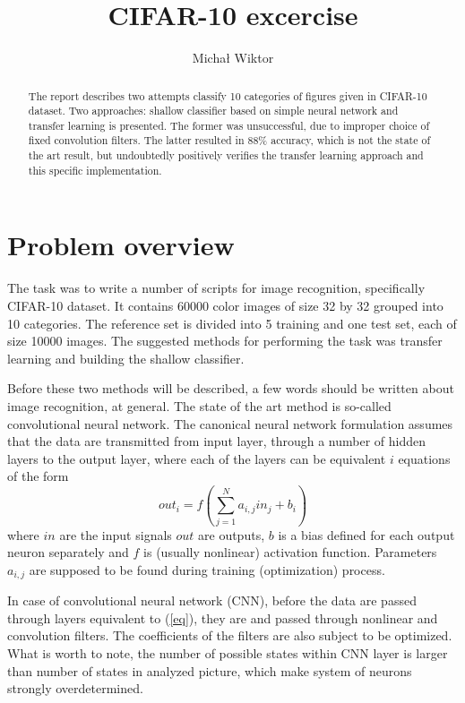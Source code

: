 \documentclass{article}
\author{Micha\l{ }Wiktor}
\title{CIFAR-10 excercise}
\date{}
\begin{document}
\maketitle
\begin{abstract}
  The report describes two attempts classify
  10 categories of figures given in CIFAR-10 dataset.
  Two approaches: shallow classifier based on simple neural network
  and transfer learning is presented.
  The former was unsuccessful, due to improper choice of fixed
  convolution filters. The latter resulted in 88\% accuracy,
  which is not the state of the art result, but undoubtedly positively
  verifies the transfer learning approach and this specific implementation.
\end{abstract}

\section{Problem overview}

The task was to write a number of scripts for image recognition, specifically CIFAR-10 dataset.
It contains 60000 color images of size 32 by 32 grouped into 10 categories.
The reference set is divided into 5 training and one test set, each of size 10000
images. The suggested methods for performing the task was transfer learning and
building the shallow classifier.

Before these two methods will be described, a few words should be written about
image recognition, at general. The state of the art method is so-called
convolutional neural network. The canonical neural network formulation assumes
that  the data are transmitted from input layer, through a number of hidden layers
to the output layer, where each of the layers can be equivalent $i$ equations of the form
\begin{equation}
  \label{eq}
  out_i = f \left( \sum_{j=1}^{N} a_{i,j} in_j + b_i \right)
\end{equation}
where $in$ are the input signals $out$ are outputs, $b$ is a bias
defined for each output neuron separately and $f$ is (usually nonlinear)
activation function. Parameters $a_{i,j}$ are supposed to be found during training
(optimization) process.

In case of convolutional neural network (CNN), before the data are passed through
layers equivalent to (\ref{eq}), they are and passed through nonlinear and convolution
filters. The coefficients of the filters are also subject to be optimized.
What is worth to note, the number of possible states
within CNN layer is larger than number of states in analyzed picture, which
make system of neurons strongly overdetermined.
\end{document}
